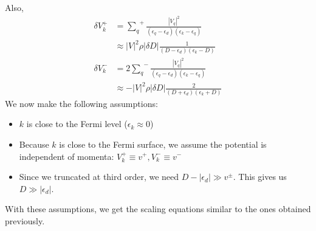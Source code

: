 \documentclass[twoside]{report}
\numberwithin{equation}{section}
\begin{document}
Also,
\begin{equation}\begin{aligned}
\delta V_k^+ &= {\sum_q}^+ \frac{|V_q|^2}{(\epsilon_q - \epsilon_d)(\epsilon_k - \epsilon_q)}\\
           &\approx |V|^2 \rho |\delta D|\frac{1}{(D - \epsilon_d)(\epsilon_k - D)}\\
\delta V_k^- &= 2{\sum_q}^- \frac{|V_q|^2}{(\epsilon_q - \epsilon_d)(\epsilon_k - \epsilon_q)}\\
           &\approx -|V|^2 \rho |\delta D|\frac{2}{(D + \epsilon_d)(\epsilon_k + D)}
\end{aligned}\end{equation}
We now make the following assumptions:
\begin{itemize}
	\item \(k\) is close to the Fermi level (\(\epsilon_k \approx 0\))
	\item Because \(k\) is close to the Fermi surface, we assume the potential is independent of momenta: \(V_k^+ \equiv v^+, V^-_k \equiv v^-\)
	\item Since we truncated at third order, we need \(D - |\epsilon_d| \gg v^\pm\).
		This gives us \(D \gg |\epsilon_d|\).
\end{itemize}
With these assumptions, we get the scaling equations similar to the ones obtained previously.
\end{document}
